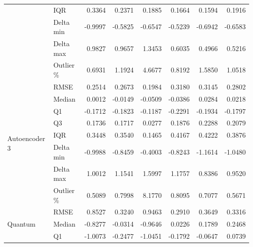 \begin{tabular}{llrrrrrr}
 & IQR & {\cellcolor[HTML]{D1E7DD}} 0.3364 & {\cellcolor[HTML]{D1E7DD}} 0.2371 & {\cellcolor[HTML]{F8D7DA}} 0.1885 & {\cellcolor[HTML]{D1E7DD}} 0.1664 & {\cellcolor[HTML]{D1E7DD}} 0.1594 & {\cellcolor[HTML]{D1E7DD}} 0.1916 \\
 & Delta min & -0.9997 & {\cellcolor[HTML]{D1E7DD}} -0.5825 & -0.6547 & {\cellcolor[HTML]{D1E7DD}} -0.5239 & {\cellcolor[HTML]{D1E7DD}} -0.6942 & {\cellcolor[HTML]{D1E7DD}} -0.6583 \\
 & Delta max & 0.9827 & {\cellcolor[HTML]{D1E7DD}} 0.9657 & 1.3453 & {\cellcolor[HTML]{D1E7DD}} 0.6035 & {\cellcolor[HTML]{D1E7DD}} 0.4966 & {\cellcolor[HTML]{D1E7DD}} 0.5216 \\
 & Outlier \% & 0.6931 & {\cellcolor[HTML]{F8D7DA}} 1.1924 & {\cellcolor[HTML]{D1E7DD}} 4.6677 & {\cellcolor[HTML]{F8D7DA}} 0.8192 & {\cellcolor[HTML]{F8D7DA}} 1.5850 & 1.0518 \\
\hline
 \multirow[c]{8}{*}{Autoencoder 3} & RMSE & 0.2514 & 0.2673 & 0.1984 & 0.3180 & 0.3145 & 0.2802 \\
 & Median & 0.0012 & -0.0149 & -0.0509 & {\cellcolor[HTML]{F8D7DA}} -0.0386 & 0.0284 & 0.0218 \\
 & Q1 & -0.1712 & -0.1823 & -0.1187 & {\cellcolor[HTML]{F8D7DA}} -0.2291 & {\cellcolor[HTML]{F8D7DA}} -0.1934 & -0.1797 \\
 & Q3 & 0.1736 & 0.1717 & {\cellcolor[HTML]{D1E7DD}} 0.0277 & 0.1876 & 0.2288 & 0.2079 \\
 & IQR & 0.3448 & 0.3540 & 0.1465 & 0.4167 & 0.4222 & 0.3876 \\
 & Delta min & {\cellcolor[HTML]{D1E7DD}} -0.9988 & -0.8459 & -0.4003 & -0.8243 & {\cellcolor[HTML]{F8D7DA}} -1.1614 & -1.0480 \\
 & Delta max & {\cellcolor[HTML]{F8D7DA}} 1.0012 & 1.1541 & 1.5997 & 1.1757 & 0.8386 & 0.9520 \\
 & Outlier \% & 0.5089 & 0.7998 & 8.1770 & 0.8095 & 0.7077 & 0.5671 \\
\hline
 \multirow[c]{8}{*}{Quantum} & RMSE & {\cellcolor[HTML]{F8D7DA}} 0.8527 & {\cellcolor[HTML]{F8D7DA}} 0.3240 & {\cellcolor[HTML]{F8D7DA}} 0.9463 & 0.2910 & {\cellcolor[HTML]{F8D7DA}} 0.3649 & {\cellcolor[HTML]{F8D7DA}} 0.3316 \\
 & Median & {\cellcolor[HTML]{F8D7DA}} -0.8277 & {\cellcolor[HTML]{F8D7DA}} -0.0314 & {\cellcolor[HTML]{F8D7DA}} -0.9646 & 0.0226 & {\cellcolor[HTML]{F8D7DA}} 0.1789 & {\cellcolor[HTML]{F8D7DA}} 0.2468 \\
 & Q1 & {\cellcolor[HTML]{F8D7DA}} -1.0073 & {\cellcolor[HTML]{F8D7DA}} -0.2477 & {\cellcolor[HTML]{F8D7DA}} -1.0451 & -0.1792 & {\cellcolor[HTML]{D1E7DD}} -0.0647 & {\cellcolor[HTML]{D1E7DD}} 0.0739 \\

\end{tabular}
